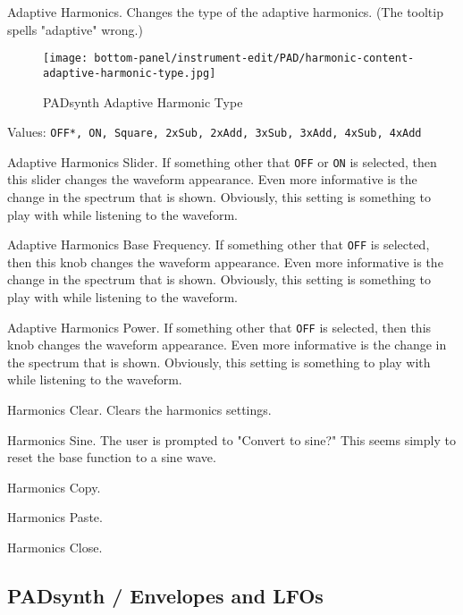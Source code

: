    Adaptive Harmonics.
   Changes the type of the adaptive harmonics.
   (The tooltip spells "adaptive" wrong.)

\begin{figure}[H]
   \centering
   \texttt{[image: bottom-panel/instrument-edit/PAD/harmonic-content-adaptive-harmonic-type.jpg]}
   \caption{PADsynth Adaptive Harmonic Type}
   \label{fig:padsynth_adaptive_harmonic_type}
\end{figure}

   Values: \texttt{OFF*, ON, Square, 2xSub, 2xAdd, 3xSub, 3xAdd, 4xSub, 4xAdd}

   Adaptive Harmonics Slider.
   If something other that \texttt{OFF} or \texttt{ON} is selected,
   then this slider changes the waveform appearance.
   Even more informative is the change in the spectrum that is shown.
   Obviously, this setting is something to play with while listening to the
   waveform.

   Adaptive Harmonics Base Frequency.
   If something other that \texttt{OFF} is selected,
   then this knob changes the waveform appearance.
   Even more informative is the change in the spectrum that is shown.
   Obviously, this setting is something to play with while listening to the
   waveform.

   Adaptive Harmonics Power.
   If something other that \texttt{OFF} is selected,
   then this knob changes the waveform appearance.
   Even more informative is the change in the spectrum that is shown.
   Obviously, this setting is something to play with while listening to the
   waveform.

   Harmonics Clear.
   Clears the harmonics settings.

   Harmonics Sine.
   The user is prompted to "Convert to sine?"
   This seems simply to reset the base function to a sine wave.

   Harmonics Copy.

   Harmonics Paste.

   Harmonics Close.

\subsection{PADsynth / Envelopes and LFOs}
\label{subsec:padsynth_envelopes_lfos}

